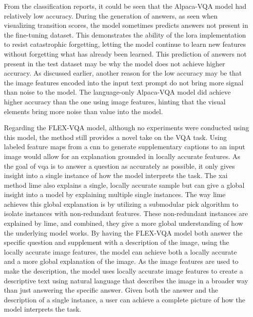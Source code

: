 From the classification reports, it could be seen that the Alpaca-VQA model had relatively low accuracy. During the generation of answers, as seen when visualizing transition scores, the model sometimes predicts answers not present in the fine-tuning dataset. This demonstrates the ability of the \gls{lora} implementation to resist catastrophic forgetting, letting the model continue to learn new features without forgetting what has already been learned. 
This prediction of answers not present in the test dataset may be why the model does not achieve higher accuracy. As discussed earlier, another reason for the low accuracy may be that the image features encoded into the input text prompt do not bring more signal than noise to the model. The language-only Alpaca-VQA model did achieve higher accuracy than the one using image features, hinting that the visual elements bring more noise than value into the model. 



Regarding the FLEX-VQA model, although no experiments were conducted using this model, the method still provides a novel take on the VQA task. Using labeled feature maps from a \gls{cnn} to generate supplementary captions to an input image would allow for an explanation grounded in locally accurate features.
As the goal of \gls{vqa} is to answer a question as accurately as possible, it only gives insight into a single instance of how the model interprets the task. The \gls{xai} method \gls{lime} also explains a single, locally accurate sample but can give a global insight into a model by explaining multiple single instances. The way \gls{lime} achieves this global explanation is by utilizing a submodular pick algorithm to isolate instances with non-redundant features. These non-redundant instances are explained by \gls{lime}, and combined, they give a more global understanding of how the underlying model works.
By having the FLEX-VQA model both answer the specific question and supplement with a description of the image, using the locally accurate image features, the model can achieve both a locally accurate and a more global explanation of the image. As the image features are used to make the description, the model uses locally accurate image features to create a descriptive text using natural language that describes the image in a broader way than just answering the specific answer. Given both the answer and the description of a single instance, a user can achieve a complete picture of how the model interprets the task.


